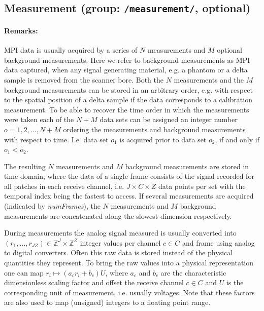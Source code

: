 \documentclass[landscape,a4paper]{article} %
\newcommand{\inl}[1]{\lstinline[columns=fixed]{#1}}
\begin{document}
\subsection{Measurement (group: \inl{/measurement/}, optional)}
\begin{multicols}{2}

\paragraph{Remarks:}
MPI data is usually acquired by a series of $N$ measurements and $M$ optional background measurements. Here we refer to background measurements as MPI data captured, when any signal generating material, e.g. a phantom or a delta sample is removed from the scanner bore. Both the $N$ measurements and the $M$ background measurements can be stored in an arbitrary order, e.g. with respect to the spatial position of a delta sample if the data corresponds to a calibration measurement. To be able to recover the time order in which the measurements were taken each of the $N+M$ data sets can be assigned an integer number $o = 1,2,\dots,N+M$ ordering the measurements and background measurements with respect to time. I.e. data set $o_1$ is acquired prior to data set $o_2$, if and only if $o_1 < o_2$.

The resulting $N$ measurements and $M$ background measurements are stored in time domain, where the data of a single frame consists of the signal recorded for all patches in each receive channel, i.e. $J \times C \times Z$ data points per set with the temporal index being the fastest to access. If several measurements are acquired (indicated by \textit{numFrames}), the $N$ measurements and $M$ background measurements are concatenated along the slowest dimension respectively.

During measurements the analog signal measured is usually converted into $(r_1,\dots,r_{JZ}) \in \mathbb Z^J \times \mathbb Z^Z$ integer values per channel $c \in C$ and frame using analog to digital converters. Often this raw data is stored instead of the physical quantities they represent. To bring the raw values into a physical representation one can map $r_i \mapsto (a_c r_i + b_c) U$, where $a_c$ and $b_c$ are the characteristic dimensionless scaling factor and offset the receive channel $c \in C$ and $U$ is the corresponding unit of measurement, i.e. usually voltages. Note that these factors are also used to map (unsigned) integers to a floating point range.
\end{multicols}
\end{document}
